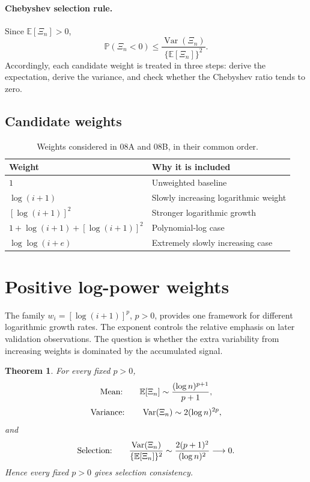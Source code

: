 \documentclass[11pt]{article}
\newtheorem{theorem}{Theorem}[section]
\begin{document}
\paragraph{Chebyshev selection rule.}
Since $\mathbb E[\Xi_n]>0$,
\begin{equation}
\mathbb P(\Xi_n<0)
\leq\frac{\operatorname{Var}(\Xi_n)}{\{\mathbb E[\Xi_n]\}^2}.
\label{eq:chebyshev}
\end{equation}
Accordingly, each candidate weight is treated in three steps: derive the
expectation, derive the variance, and check whether the Chebyshev ratio tends
to zero.

\subsection{Candidate weights}

\begin{table}[ht]
\centering
\begin{tabular}{@{}ll@{}}
\toprule
Weight & Why it is included \\
\midrule
$1$ & Unweighted baseline \\
$\log(i+1)$ & Slowly increasing logarithmic weight \\
$[\log(i+1)]^2$ & Stronger logarithmic growth \\
$1+\log(i+1)+[\log(i+1)]^2$ & Polynomial-log case \\
$\log\log(i+e)$ & Extremely slowly increasing case \\
\bottomrule
\end{tabular}
\caption{Weights considered in 08A and 08B, in their common order.}
\end{table}

\section{Positive log-power weights}

The family $w_i=[\log(i+1)]^p$, $p>0$, provides one framework for different
logarithmic growth rates.  The exponent controls the relative emphasis on
later validation observations.  The question is whether the extra
variability from increasing weights is dominated by the accumulated signal.

\begin{theorem}\label{thm:logpower}
For every fixed $p>0$,
\[
\textnormal{Mean:}\qquad
\mathbb E[\Xi_n]\sim\frac{(\log n)^{p+1}}{p+1},
\]
\[
\textnormal{Variance:}\qquad
\operatorname{Var}(\Xi_n)\sim2(\log n)^{2p},
\]
and
\[
\textnormal{Selection:}\qquad
\frac{\operatorname{Var}(\Xi_n)}{\{\mathbb E[\Xi_n]\}^2}
\sim\frac{2(p+1)^2}{(\log n)^2}\longrightarrow0.
\]
Hence every fixed $p>0$ gives selection consistency.
\end{theorem}
\end{document}
